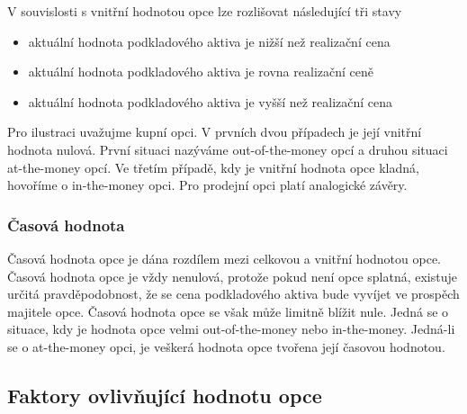 \documentclass[a4paper]{book}
\begin{document}
V souvislosti s vnitřní hodnotou opce lze rozlišovat následující tři stavy
\begin{itemize}
\item aktuální hodnota podkladového aktiva je nižší než realizační cena
\item aktuální hodnota podkladového aktiva je rovna realizační ceně
\item aktuální hodnota podkladového aktiva je vyšší než realizační cena
\end{itemize}
Pro ilustraci uvažujme kupní opci. V prvních dvou případech je její vnitřní hodnota nulová. První situaci nazýváme out-of-the-money opcí a druhou situaci at-the-money opcí. Ve třetím případě, kdy je vnitřní hodnota opce kladná, hovoříme o in-the-money opci. Pro prodejní opci platí analogické závěry.

\subsubsection{Časová hodnota}

Časová hodnota opce je dána rozdílem mezi celkovou a vnitřní hodnotou opce. Časová hodnota opce je vždy nenulová, protože pokud není opce splatná, existuje určitá pravděpodobnost, že se cena podkladového aktiva bude vyvíjet ve prospěch majitele opce. Časová hodnota opce se však může limitně blížit nule. Jedná se o situace, kdy je hodnota opce velmi out-of-the-money nebo in-the-money. Jedná-li se o at-the-money opci, je veškerá hodnota opce tvořena její časovou hodnotou.

\subsection{Faktory ovlivňující hodnotu opce}
\end{document}
